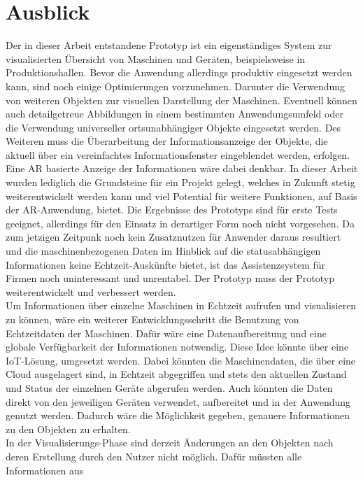 \chapter{Ausblick}
\label{chap:Ausblick}
Der in dieser Arbeit entstandene Prototyp ist ein eigenständiges System zur visualisierten Übersicht von Maschinen und Geräten, beispielsweise in Produktionshallen. 
Bevor die Anwendung allerdings produktiv eingesetzt werden kann, sind noch einige Optimierungen vorzunehmen. Darunter die Verwendung von weiteren Objekten 
zur visuellen Darstellung der Maschinen. Eventuell können auch detailgetreue Abbildungen in einem bestimmten Anwendungsumfeld oder die Verwendung universeller 
ortsunabhängiger Objekte eingesetzt werden. Des Weiteren muss die Überarbeitung der Informationsanzeige der Objekte, die aktuell über ein vereinfachtes Informationsfenster 
eingeblendet werden, erfolgen. Eine \acl{AR} basierte Anzeige der Informationen wäre dabei denkbar. In dieser Arbeit wurden lediglich die Grundsteine für ein Projekt 
gelegt, welches in Zukunft stetig weiterentwickelt werden kann und viel Potential für weitere Funktionen, auf Basis der \acs{AR}-Anwendung, bietet. Die Ergebnisse 
des Prototyps sind für erste Tests geeignet, allerdings für den %
Einsatz in derartiger Form noch nicht vorgesehen. Da zum jetzigen Zeitpunk noch kein Zusatznutzen für Anwender 
daraus resultiert und die maschinenbezogenen Daten im Hinblick auf die statusabhängigen Informationen keine Echtzeit-Auskünfte bietet, ist das Assistenzsystem für Firmen 
noch uninteressant und unrentabel. Der Prototyp muss der Prototyp weiterentwickelt und verbessert werden. 
\\ 
\linebreak
Um Informationen über einzelne Maschinen in Echtzeit aufrufen und visualisieren zu können, wäre ein weiterer Entwicklungsschritt die Benutzung von Echtzeitdaten der 
Maschinen. Dafür wäre eine Datenaufbereitung und eine globale Verfügbarkeit der Informationen notwendig. Diese Idee könnte über eine \acl{IoT}-Lösung, umgesetzt werden. 
Dabei könnten die Maschinendaten, die über eine Cloud ausgelagert sind, in Echtzeit abgegriffen und stets den aktuellen Zustand und Status der einzelnen Geräte 
abgerufen werden. Auch könnten die Daten direkt von den jeweiligen Geräten verwendet, aufbereitet und in der Anwendung genutzt werden. Dadurch wäre die Möglichkeit 
gegeben, genauere Informationen zu den Objekten zu erhalten.
\\ 
\linebreak
In der Visualisierungs-Phase sind derzeit Änderungen an den Objekten nach deren Erstellung durch den Nutzer nicht möglich. Dafür müssten alle Informationen aus 

